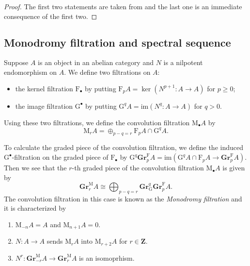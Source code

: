\documentclass[10pt]{amsart}
\newcommand*\Z{\mathds{Z}}
\newcommand*\ZZ{|[draw,circle]| \Z_2}
\numberwithin{equation}{section}
\theoremstyle{plain}
\numberwithin{equation}{section}
\theoremstyle{definition}
\theoremstyle{remark}
\def\im{\mathrm{im}}
\def\ZZ{\mathbf{Z}}
\def\rmG{\mathrm{G}}
\def\rmF{\mathrm{F}}
\def\rmM{\mathrm{M}}
\newcommand{\Gr}{\mathbf{Gr}}
\begin{document}
\begin{proof}
The first two statements are taken from  \cite[Corollary 1.3]{Saito} and the last one is an immediate consequence of the first two. 
\end{proof}
\subsection{Monodromy filtration and spectral sequence} Suppose $A$ is an object in an abelian category and $N$ is a nilpotent endomorphism on $A$. We define two filtrations on $A$:
\begin{itemize}
\item  the kernel filtration $\rmF_{\bullet}$ by putting $\rmF_{p}A=\ker(N^{p+1}: A\rightarrow A)$ for $p\geq 0$;
\item  the image filtration $\rmG^{\bullet}$ by putting $\rmG^{q}A=\im(N^{q}: A\rightarrow A)$ for $q>0$.
\end{itemize}
Using these two filtrations,  we define the convolution filtration $\rmM_{\bullet}A$ by 
\begin{equation*}
\rmM_{r}A=\oplus_{p-q=r}\rmF_{p}A\cap \rmG^{q}A.
\end{equation*} 

To calculate the graded piece of the convolution filtration, we define the induced $\rmG^{\bullet}$-filtration on the graded piece of $\rmF_{\bullet}$ by $\rmG^{q}\Gr^{\rmF}_{p}A=\im(\rmG^{q}A\cap \rmF_{p}A\rightarrow \Gr^{\rmF}_{p}A)$.  Then we see that the $r$-th graded piece of the convolution filtration $\rmM_{\bullet}A$ is given by
\begin{equation*}
\Gr^{\rmM}_{r}A\cong\bigoplus_{p-q=r}\Gr^{q}_{\rmG}\Gr^{\rmF}_{p}A.
\end{equation*}
The convolution filtration in this case is known as the \emph{Monodromy filtration} and it is characterized by
\begin{enumerate}
\item $\rmM_{-n}A=A$ and $\rmM_{n+1}A=0$.
\item $N: A\rightarrow A$ sends $\rmM_{r}A$ into $\rmM_{r+2}A$ for $r\in\ZZ$.
\item $N^{r}: \Gr^{\rmM}_{-r}A\rightarrow \Gr^{\rmM}_{r}A$ is an isomoprhism. 
\end{enumerate}
\end{document}
